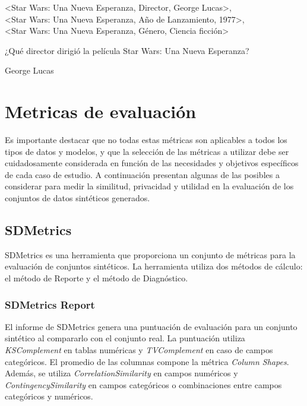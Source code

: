 \begin{tcolorbox}[colback=white,colframe=black!50!white,title=Input]
<Star Wars: Una Nueva Esperanza, Director, George Lucas>, \\
<Star Wars: Una Nueva Esperanza, Año de Lanzamiento, 1977>, \\
<Star Wars: Una Nueva Esperanza, Género, Ciencia ficción>
\end{tcolorbox}
\begin{tcolorbox}[colback=white,colframe=black!50!white,title=Pregunta]
¿Qué director dirigió la película Star Wars: Una Nueva Esperanza?
\end{tcolorbox}
\begin{tcolorbox}[colback=white,colframe=black!50!white,title=Respuesta esperada]
George Lucas
\end{tcolorbox}

\newpage
\section{Metricas de evaluación}
Es importante destacar que no todas estas métricas son aplicables a todos los tipos de datos y modelos, y que la selección de las métricas a utilizar debe ser cuidadosamente considerada en función de las necesidades y objetivos específicos de cada caso de estudio.
A continuación presentan algunas de las posibles a considerar para medir la similitud, privacidad y utilidad en la evaluación de los conjuntos de datos sintéticos generados.

\subsection{SDMetrics}
SDMetrics es una herramienta que proporciona un conjunto de métricas para la evaluación de conjuntos sintéticos. La herramienta utiliza dos métodos de cálculo: el método de Reporte y el método de Diagnóstico.

\subsubsection{SDMetrics Report}

El informe de SDMetrics genera una puntuación de evaluación para un conjunto sintético al compararlo con el conjunto real. La puntuación utiliza \emph{KSComplement} en tablas numéricas y \emph{TVComplement} en caso de campos categóricos. El promedio de las columnas compone la métrica \emph{Column Shapes}. Además, se utiliza \emph{CorrelationSimilarity} en campos numéricos y \emph{ContingencySimilarity} en campos categóricos o combinaciones entre campos categóricos y numéricos.


